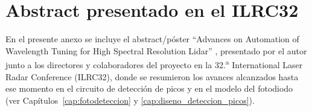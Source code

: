 \chapter{Abstract presentado en el ILRC32}
\label{anexo:ilrc32}

En el presente anexo se incluye el abstract/p\'oster ``Advances on
Automation of Wavelength Tuning for High Spectral Resolution Lidar''
\cite{galvagno2026ilrc}, presentado por el autor junto a los directores
y colaboradores del proyecto en la 32.\textsuperscript{a} International
Laser Radar Conference (ILRC32), donde se resumieron los avances
alcanzados hasta ese momento en el circuito de detecci\'on de picos y en
el modelo del fotodiodo (ver Cap\'itulos~\ref{cap:fotodeteccion} y
\ref{cap:diseno_deteccion_picos}).



